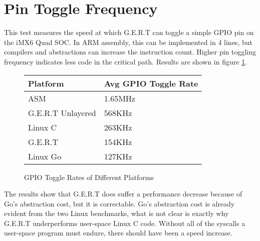 
\section{Pin Toggle Frequency}\label{sec:pin_toggle}
This test measures the speed at which G.E.R.T can toggle a simple GPIO pin on
the iMX6 Quad SOC. In ARM assembly, this can be implemented in 4 lines, but compilers and 
abstractions can increase the instruction count. Higher pin
toggling frequency indicates less code in the critical path.
Results are shown in figure \ref{fig:toggle}.


\begin{figure} [h]
\begin{center}
  \begin{tabular}{ | l | l |}
    \hline
    Platform & Avg GPIO Toggle Rate \\ \hline
    ASM & 1.65MHz \\ \hline
    G.E.R.T Unlayered & 568KHz \\ \hline
    Linux C & 263KHz \\ \hline
    G.E.R.T & 154KHz \\ \hline
    Linux Go & 127KHz \\
    \hline
  \end{tabular}
\end{center}
  \caption{GPIO Toggle Rates of Different Platforms}  \label{fig:toggle}
\end{figure}

The results show that G.E.R.T does suffer a performance decrease because of
Go's abstraction cost, but it is correctable. Go's abstraction cost is already
evident from the two Linux benchmarks,
what is not clear is exactly why G.E.R.T underperforms user-space Linux C code.
Without all of the syscalls a user-space program must endure, there should have
been a speed increase.

